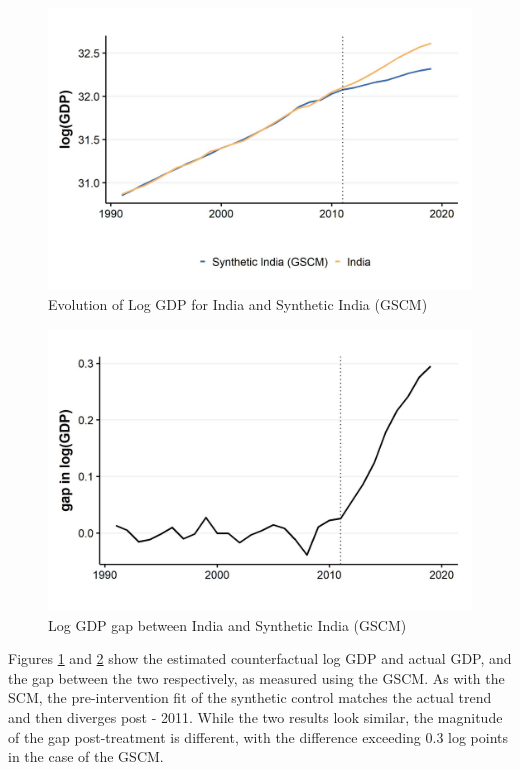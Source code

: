 \documentclass[12pt,nobind, a4paper]{reedthesis}
\begin{document}
 \newpage
 \begin{figure}

 {\centering \includegraphics[width=1\linewidth]{figure/indiagsynth} 

 }

 \caption{Evolution of Log GDP for India and Synthetic India (GSCM)}\label{fig:indgsyn}
 \end{figure}
 \begin{figure}

 {\centering \includegraphics[width=1\linewidth]{figure/indiagsynthgap} 

 }

 \caption{Log GDP gap between India and Synthetic India (GSCM)}\label{fig:indgsyngap}
 \end{figure}
 Figures \ref{fig:indgsyn} and \ref{fig:indgsyngap} show the estimated counterfactual log GDP and actual GDP, and the gap between the two respectively, as measured using the GSCM. As with the SCM, the pre-intervention fit of the synthetic control matches the actual trend and then diverges post - 2011. While the two results look similar, the magnitude of the gap post-treatment is different, with the difference exceeding 0.3 log points in the case of the GSCM.
\end{document}
